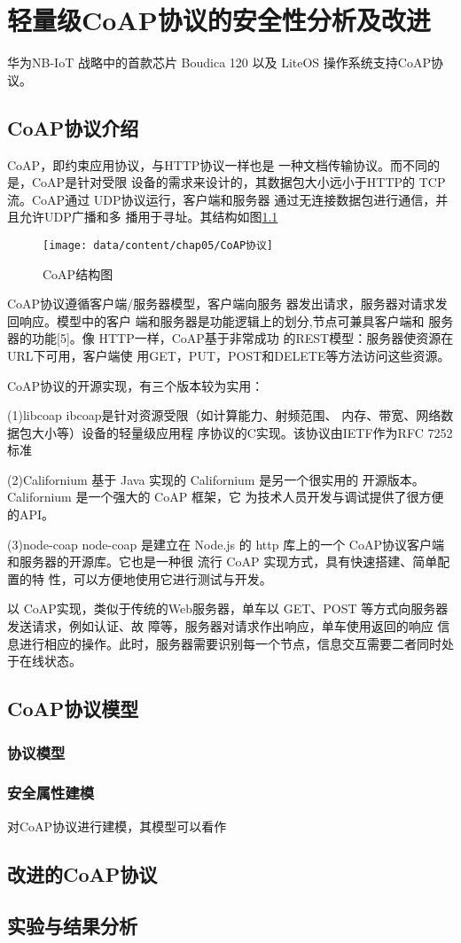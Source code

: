\chapter{轻量级CoAP协议的安全性分析及改进}
华为NB-IoT 战略中的首款芯片 Boudica 120 以及 LiteOS
操作系统支持CoAP协议。


\section{CoAP协议介绍}
CoAP，即约束应用协议，与HTTP协议一样也是
一种文档传输协议。而不同的是，CoAP是针对受限
设备的需求来设计的，其数据包大小远小于HTTP的
TCP流。CoAP通过 UDP协议运行，客户端和服务器
通过无连接数据包进行通信，并且允许UDP广播和多
播用于寻址。其结构如图\ref{fig-coap}
\begin{figure}[htp]
	\centering
	\texttt{[image: data/content/chap05/CoAP协议]}
	\caption{CoAP结构图}
	\label{fig-coap}
\end{figure}
CoAP协议遵循客户端/服务器模型，客户端向服务
器发出请求，服务器对请求发回响应。模型中的客户
端和服务器是功能逻辑上的划分,节点可兼具客户端和
服务器的功能[5]。像 HTTP一样，CoAP基于非常成功
的REST模型：服务器使资源在URL下可用，客户端使
用GET，PUT，POST和DELETE等方法访问这些资源。

CoAP协议的开源实现，有三个版本较为实用：

(1)libcoap
ibcoap是针对资源受限（如计算能力、射频范围、
内存、带宽、网络数据包大小等）设备的轻量级应用程
序协议的C实现。该协议由IETF作为RFC 7252标准

(2)Californium
基于 Java 实现的 Californium 是另一个很实用的
开源版本。Californium 是一个强大的 CoAP 框架，它
为技术人员开发与调试提供了很方便的API。

(3)node-coap
node-coap 是建立在 Node.js 的 http 库上的一个
CoAP协议客户端和服务器的开源库。它也是一种很
流行 CoAP 实现方式，具有快速搭建、简单配置的特
性，可以方便地使用它进行测试与开发。

以 CoAP实现，类似于传统的Web服务器，单车以
GET、POST 等方式向服务器发送请求，例如认证、故
障等，服务器对请求作出响应，单车使用返回的响应
信息进行相应的操作。此时，服务器需要识别每一个节点，信息交互需要二者同时处于在线状态。


\section{CoAP协议模型}


\subsection*{协议模型}

\subsection*{安全属性建模}
对CoAP协议进行建模，其模型可以看作

\section{改进的CoAP协议}


\section{实验与结果分析}